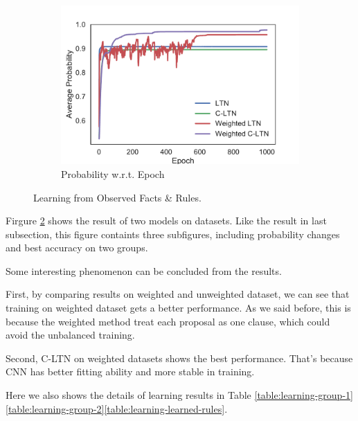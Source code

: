 \begin{figure}[!]
    \begin{subfigure}[]{0.24\textwidth}
        \includegraphics[width=\textwidth]{img/curve2.pdf}
        \caption{Probability w.r.t. Epoch}
        \label{fig:learning-prob-epoch}
    \end{subfigure}
    \caption{Learning from Observed Facts \& Rules.}
    \label{fig:learning}
\end{figure}

Firgure \ref{fig:learning} shows the result of two models on datasets. Like the result in last subsection, this figure containts three subfigures, including probability changes and best accuracy on two groups.

Some interesting phenomenon can be concluded from the results.

First, by comparing results on weighted and unweighted dataset, we can see that training on weighted dataset gets a better performance.
As we said before, this is because the weighted method treat each proposal as one clause, which could avoid the unbalanced training.

Second, C-LTN on weighted datasets shows the best performance. That's because CNN has better fitting ability and more stable in training.

Here we also shows the details of learning results in Table \ref{table:learning-group-1}\ref{table:learning-group-2}\ref{table:learning-learned-rules}.

